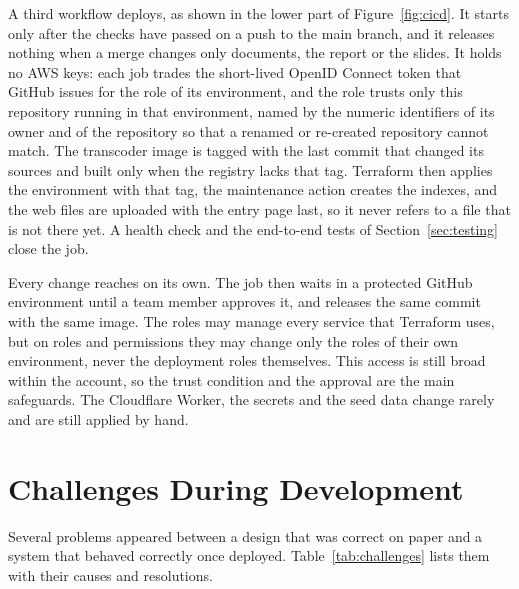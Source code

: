 A third workflow deploys, as shown in the lower part of Figure~\ref{fig:cicd}. It starts only after
the checks have passed on a push to the main branch, and it releases nothing when a merge changes only
documents, the report or the slides. It holds no AWS keys: each job trades the short-lived OpenID
Connect token that GitHub issues for the role of its environment, and the role trusts only this
repository running in that environment, named by the numeric identifiers of its owner and of the
repository so that a renamed or re-created repository cannot match. The transcoder image is tagged
with the last commit that changed its sources and built only when the registry lacks that tag.
Terraform then applies the environment with that tag, the maintenance action creates the indexes, and
the web files are uploaded with the entry page last, so it never refers to a file that is not there
yet. A health check and the end-to-end tests of Section~\ref{sec:testing} close the job.

Every change reaches  on its own. The  job then waits in a protected GitHub
environment until a team member approves it, and releases the same commit with the same image. The
roles may manage every service that Terraform uses, but on roles and permissions they may change only
the roles of their own environment, never the deployment roles themselves. This access is still broad
within the account, so the trust condition and the approval are the main safeguards. The Cloudflare
Worker, the secrets and the seed data change rarely and are still applied by hand.

\section{Challenges During Development}
\label{sec:challenges}

Several problems appeared between a design that was correct on paper and a system that behaved
correctly once deployed. Table~\ref{tab:challenges} lists them with their causes and resolutions.

